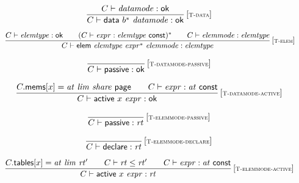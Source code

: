 $$
\begin{array}{@{}c@{}}\displaystyle
\frac{
C \vdash {\mathit{datamode}} : \mathsf{ok}
}{
C \vdash \mathsf{data}~{b^\ast}~{\mathit{datamode}} : \mathsf{ok}
} \, {[\textsc{\scriptsize T{-}data}]}
\qquad
\end{array}
$$

$$
\begin{array}{@{}c@{}}\displaystyle
\frac{
C \vdash {\mathit{elemtype}} : \mathsf{ok}
 \qquad
(C \vdash {\mathit{expr}} : {\mathit{elemtype}}~\mathsf{const})^\ast
 \qquad
C \vdash {\mathit{elemmode}} : {\mathit{elemtype}}
}{
C \vdash \mathsf{elem}~{\mathit{elemtype}}~{{\mathit{expr}}^\ast}~{\mathit{elemmode}} : {\mathit{elemtype}}
} \, {[\textsc{\scriptsize T{-}elem}]}
\qquad
\end{array}
$$

$$
\begin{array}{@{}c@{}}\displaystyle
\frac{
}{
C \vdash \mathsf{passive} : \mathsf{ok}
} \, {[\textsc{\scriptsize T{-}datamode{-}passive}]}
\qquad
\end{array}
$$

$$
\begin{array}{@{}c@{}}\displaystyle
\frac{
C{.}\mathsf{mems}{}[x] = {\mathit{at}}~{\mathit{lim}}~{\mathit{share}}~\mathsf{page}
 \qquad
C \vdash {\mathit{expr}} : {\mathit{at}}~\mathsf{const}
}{
C \vdash \mathsf{active}~x~{\mathit{expr}} : \mathsf{ok}
} \, {[\textsc{\scriptsize T{-}datamode{-}active}]}
\qquad
\end{array}
$$

$$
\begin{array}{@{}c@{}}\displaystyle
\frac{
}{
C \vdash \mathsf{passive} : {\mathit{rt}}
} \, {[\textsc{\scriptsize T{-}elemmode{-}passive}]}
\qquad
\end{array}
$$

$$
\begin{array}{@{}c@{}}\displaystyle
\frac{
}{
C \vdash \mathsf{declare} : {\mathit{rt}}
} \, {[\textsc{\scriptsize T{-}elemmode{-}declare}]}
\qquad
\end{array}
$$

$$
\begin{array}{@{}c@{}}\displaystyle
\frac{
C{.}\mathsf{tables}{}[x] = {\mathit{at}}~{\mathit{lim}}~{\mathit{rt}'}
 \qquad
C \vdash {\mathit{rt}} \leq {\mathit{rt}'}
 \qquad
C \vdash {\mathit{expr}} : {\mathit{at}}~\mathsf{const}
}{
C \vdash \mathsf{active}~x~{\mathit{expr}} : {\mathit{rt}}
} \, {[\textsc{\scriptsize T{-}elemmode{-}active}]}
\qquad
\end{array}
$$

